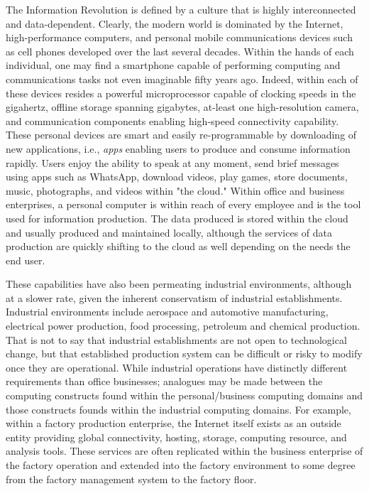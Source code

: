 The Information Revolution is defined by a culture that is highly interconnected and data-dependent.  Clearly, the modern world is dominated by the Internet, high-performance computers, and personal mobile communications devices such as cell phones developed over the last several decades. Within the hands of each individual, one may find a smartphone capable of performing computing and communications tasks not even imaginable fifty years ago.  Indeed, within each of these devices resides a powerful microprocessor capable of clocking speeds in the gigahertz, offline storage spanning gigabytes, at-least one high-resolution camera, and communication components enabling high-speed connectivity capability.  These personal devices are smart and easily re-programmable by downloading of new applications, i.e., \textit{apps} enabling users to produce and consume information rapidly.  Users enjoy the ability to speak at any moment, send brief messages using apps such as WhatsApp\texttrademark, download videos, play games, store documents, music, photographs, and videos within "the cloud."  Within office and business enterprises, a personal computer is within reach of every employee and is the tool used for information production.  The data produced is stored within the cloud and usually produced and maintained locally, although the services of data production are quickly shifting to the cloud as well depending on the needs the end user.

These capabilities have also been permeating industrial environments, although at a slower rate, given the inherent conservatism of industrial establishments.  Industrial environments include aerospace and automotive manufacturing, electrical power production, food processing, petroleum and chemical production.  That is not to say that industrial establishments are not open to technological change, but that established production system can be difficult or risky to modify once they are operational.  While industrial operations have distinctly different requirements than office businesses; analogues may be made between the computing constructs found within the personal/business computing domains and those constructs founds within the industrial computing domains.  For example, within a factory production enterprise, the Internet itself exists as an outside entity providing global connectivity, hosting, storage, computing resource, and analysis tools.  These services are often replicated within the business enterprise of the factory operation and extended into the factory environment to some degree from the factory management system to the factory floor.  

